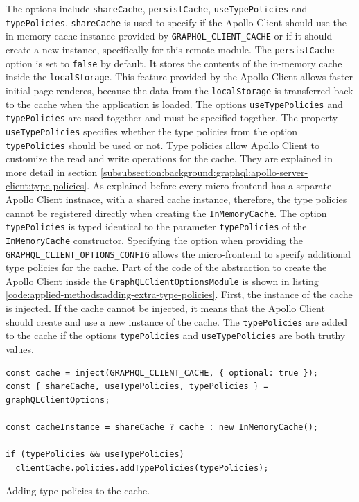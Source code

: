 \noindent The options include \texttt{shareCache}, \texttt{persistCache}, \texttt{useTypePolicies} and \texttt{typePolicies}. \texttt{shareCache} is used to specify if the Apollo Client should use the in-memory cache instance provided by \texttt{GRAPHQL\_CLIENT\_CACHE} or if it should create a new instance, specifically for this remote module. The \texttt{persistCache} option is set to \texttt{false} by default. It stores the contents of the in-memory cache inside the \texttt{localStorage}. This feature provided by the Apollo Client allows faster initial page renderes, because the data from the \texttt{localStorage} is transferred back to the cache when the application is loaded. The options \texttt{useTypePolicies} and \texttt{typePolicies} are used together and must be specified together. The property \texttt{useTypePolicies} specifies whether the type policies from the option \texttt{typePolicies} should be used or not. Type policies allow Apollo Client to customize the read and write operations for the cache. They are explained in more detail in section \ref{subsubsection:background:graphql:apollo-server-client:type-policies}. As explained before every micro-frontend has a separate Apollo Client instnace, with a shared cache instance, therefore, the type policies cannot be registered directly when creating the \texttt{InMemoryCache}. The option \texttt{typePolicies} is typed identical to the parameter \texttt{typePolicies} of the \texttt{InMemoryCache} constructor. Specifying the option when providing the \texttt{GRAPHQL\_CLIENT\_OPTIONS\_CONFIG} allows the micro-frontend to specify additional type policies for the cache. Part of the code of the abstraction to create the Apollo Client inside the \texttt{GraphQLClientOptionsModule} is shown in listing \ref{code:applied-methods:adding-extra-type-policies}. First, the instance of the cache is injected. If the cache cannot be injected, it means that the Apollo Client should create and use a new instance of the cache. The \texttt{typePolicies} are added to the cache if the options \texttt{typePolicies} and \texttt{useTypePolicies} are both truthy values.

\ifshowListings
\begin{listing}[H]
\begin{verbatim}
const cache = inject(GRAPHQL_CLIENT_CACHE, { optional: true });
const { shareCache, useTypePolicies, typePolicies } = graphQLClientOptions;

const cacheInstance = shareCache ? cache : new InMemoryCache();

if (typePolicies && useTypePolicies)
  clientCache.policies.addTypePolicies(typePolicies);
\end{verbatim}
\caption{Adding type policies to the cache.}\label{code:applied-methods:adding-extra-type-policies}
\end{listing}
\fi

